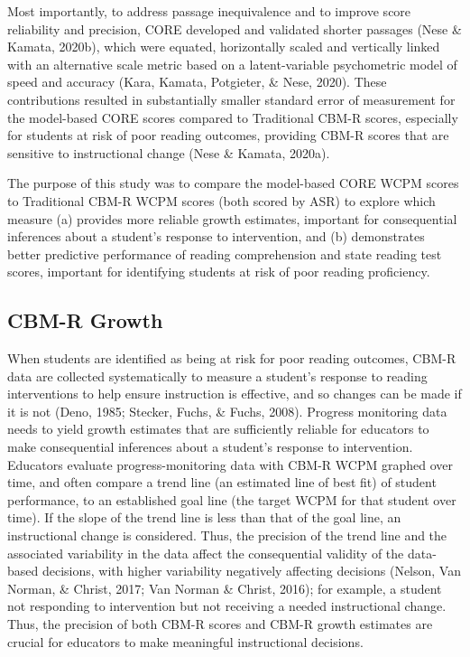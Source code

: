 \documentclass[
  english,
  man, fleqn, noextraspace]{apa6}
\begin{document}
Most importantly, to address passage inequivalence and to improve score reliability and precision, CORE developed and validated shorter passages (Nese \& Kamata, 2020b), which were equated, horizontally scaled and vertically linked with an alternative scale metric based on a latent-variable psychometric model of speed and accuracy (Kara, Kamata, Potgieter, \& Nese, 2020). These contributions resulted in substantially smaller standard error of measurement for the model-based CORE scores compared to Traditional CBM-R scores, especially for students at risk of poor reading outcomes, providing CBM-R scores that are sensitive to instructional change (Nese \& Kamata, 2020a).

The purpose of this study was to compare the model-based CORE WCPM scores to Traditional CBM-R WCPM scores (both scored by ASR) to explore which measure (a) provides more reliable growth estimates, important for consequential inferences about a student's response to intervention, and (b) demonstrates better predictive performance of reading comprehension and state reading test scores, important for identifying students at risk of poor reading proficiency.

\hypertarget{cbm-r-growth}{%
\subsection{CBM-R Growth}\label{cbm-r-growth}}

When students are identified as being at risk for poor reading outcomes, CBM-R data are collected systematically to measure a student's response to reading interventions to help ensure instruction is effective, and so changes can be made if it is not (Deno, 1985; Stecker, Fuchs, \& Fuchs, 2008). Progress monitoring data needs to yield growth estimates that are sufficiently reliable for educators to make consequential inferences about a student's response to intervention. Educators evaluate progress-monitoring data with CBM-R WCPM graphed over time, and often compare a trend line (an estimated line of best fit) of student performance, to an established goal line (the target WCPM for that student over time). If the slope of the trend line is less than that of the goal line, an instructional change is considered. Thus, the precision of the trend line and the associated variability in the data affect the consequential validity of the data-based decisions, with higher variability negatively affecting decisions (Nelson, Van Norman, \& Christ, 2017; Van Norman \& Christ, 2016); for example, a student not responding to intervention but not receiving a needed instructional change. Thus, the precision of both CBM-R scores and CBM-R growth estimates are crucial for educators to make meaningful instructional decisions.
\end{document}
